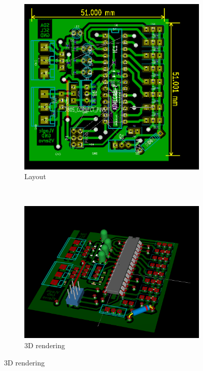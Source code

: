 \documentclass[a4paper
               ,10pt
               ,DIV=10 %
               ,BCOR=0.3cm
               ,pagesize %
               ,headings=small
               ,bibtotoc
               ]
               {scrartcl}
\begin{document}
\begin{figure}[H]
  \centering
  \begin{subfigure}[b]{0.3\textwidth}
    \centering
    \includegraphics[width=\textwidth]{pic/servoboardbrd.png}
    \caption{Layout}
		\label{figservoboardbrd}
  \end{subfigure}~
  \begin{subfigure}[b]{0.3\textwidth}
    \centering
    \includegraphics[width=\textwidth]{pic/servoboard3d.png}
    \caption{3D rendering}

\end{subfigure}
\end{figure}
\end{document}
